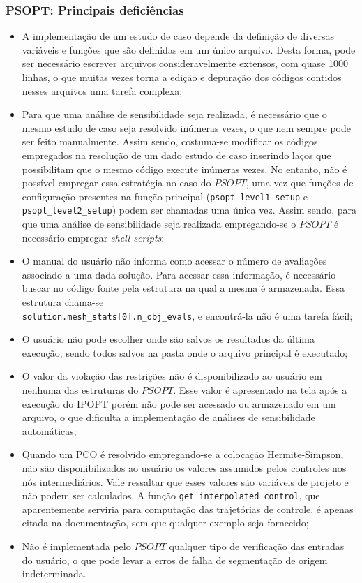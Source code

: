 \subsubsection{PSOPT: Principais deficiências}
\begin{itemize}
	\item A implementação de um estudo de caso depende da definição de diversas variáveis e funções que são definidas em um único arquivo. Desta forma, pode ser necessário escrever arquivos consideravelmente extensos, com quase 1000 linhas, o que muitas vezes torna a edição e depuração dos códigos contidos nesses arquivos uma tarefa complexa;
	
	\item Para que uma análise de sensibilidade seja realizada, é necessário que o mesmo estudo de caso seja resolvido inúmeras vezes, o que nem sempre pode ser feito manualmente. Assim sendo, costuma-se modificar os códigos empregados na resolução de um dado estudo de caso inserindo laços que possibilitam que o mesmo código execute inúmeras vezes. No entanto, não é possível empregar essa estratégia no caso do $PSOPT$, uma vez que funções de configuração presentes na função principal (\texttt{psopt\_level1\_setup} e \texttt{psopt\_level2\_setup}) podem ser chamadas uma única vez. Assim sendo, para que uma análise de sensibilidade seja realizada empregando-se o $PSOPT$ é necessário empregar \textit{shell scripts};
	
	\item O manual do usuário não informa como acessar o número de avaliações associado a uma dada solução. Para acessar essa informação, é necessário buscar no código fonte pela estrutura na qual a mesma é armazenada. Essa estrutura chama-se \\ \texttt{solution.mesh\_stats[0].n\_obj\_evals}, e encontrá-la não é uma tarefa fácil;
	
	\item O usuário não pode escolher onde são salvos os resultados da última execução, sendo todos salvos na pasta onde o arquivo principal é executado;
	
	\item O valor da violação das restrições não é disponibilizado ao usuário em nenhuma das estruturas do $PSOPT$. Esse valor é apresentado na tela após a execução do IPOPT porém não pode ser acessado ou armazenado em um arquivo,  o que dificulta a implementação de análises de sensibilidade automáticas;
	
	\item Quando um PCO é resolvido empregando-se a colocação Hermite-Simpson, não são disponibilizados ao usuário os valores assumidos pelos controles nos nós intermediários. Vale ressaltar que esses valores são variáveis de projeto e não podem ser calculados. A função \texttt{get\_interpolated\_control}, que aparentemente serviria para computação das trajetórias de controle, é apenas citada na documentação, sem que qualquer exemplo seja fornecido;
	
	\item Não é implementada pelo $PSOPT$ qualquer tipo de verificação das entradas do usuário, o que pode levar a erros de falha de segmentação de origem indeterminada.
\end{itemize}

